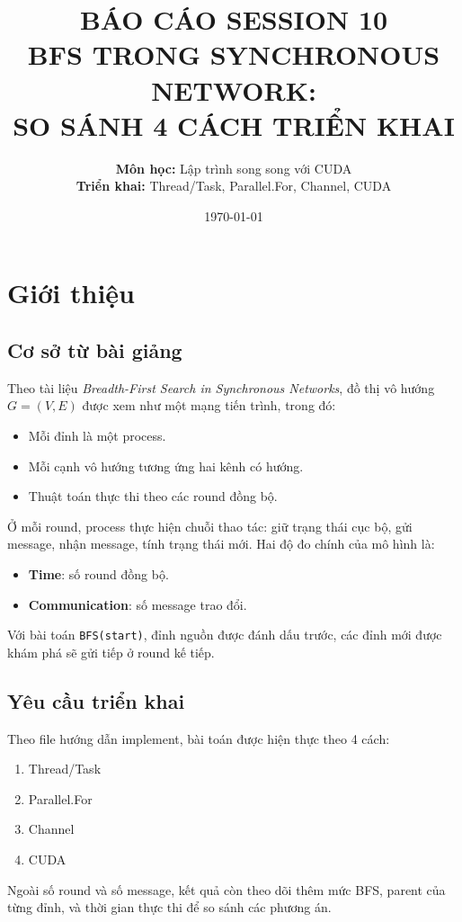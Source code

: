 \documentclass[12pt,a4paper]{article}
\title{\textbf{BÁO CÁO SESSION 10\\BFS TRONG SYNCHRONOUS NETWORK:\\SO SÁNH 4 CÁCH TRIỂN KHAI}}
\author{
    \textbf{Môn học:} Lập trình song song với CUDA\\
    \textbf{Triển khai:} Thread/Task, Parallel.For, Channel, CUDA
}
\date{\today}
\begin{document}
\maketitle
\tableofcontents
\newpage

\section{Giới thiệu}

\subsection{Cơ sở từ bài giảng}
Theo tài liệu \textit{Breadth-First Search in Synchronous Networks}, đồ thị vô hướng
$G=(V,E)$ được xem như một mạng tiến trình, trong đó:
\begin{itemize}
    \item Mỗi đỉnh là một process.
    \item Mỗi cạnh vô hướng tương ứng hai kênh có hướng.
    \item Thuật toán thực thi theo các round đồng bộ.
\end{itemize}

Ở mỗi round, process thực hiện chuỗi thao tác: giữ trạng thái cục bộ, gửi message,
nhận message, tính trạng thái mới. Hai độ đo chính của mô hình là:
\begin{itemize}
    \item \textbf{Time}: số round đồng bộ.
    \item \textbf{Communication}: số message trao đổi.
\end{itemize}

Với bài toán \texttt{BFS(start)}, đỉnh nguồn được đánh dấu trước,
các đỉnh mới được khám phá sẽ gửi tiếp ở round kế tiếp.

\subsection{Yêu cầu triển khai}
Theo file hướng dẫn implement, bài toán được hiện thực theo 4 cách:
\begin{enumerate}
    \item Thread/Task
    \item Parallel.For
    \item Channel
    \item CUDA
\end{enumerate}

Ngoài số round và số message, kết quả còn theo dõi thêm mức BFS, parent của từng đỉnh,
và thời gian thực thi để so sánh các phương án.
\end{document}
